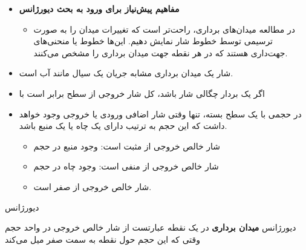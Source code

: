 \begin{ELunit}

\begin{itemize}
\tightlist
\item
  \textbf{مفاهیم پیش‌نیاز برای ورود به بحث دیورژانس}

  \begin{itemize}
  \tightlist
  \item
    در مطالعه میدان‌های برداری، راحت‌تر است که تغییرات میدان را به صورت ترسیمی توسط خطوط شار نمایش دهیم. این‌ها خطوط یا منحنی‌های جهت‌داری هستند که در هر نقطه جهت میدان برداری را مشخص می‌کنند.
  \end{itemize}
\end{itemize}


\begin{itemize}
\tightlist
\item
  شار یک میدان برداری مشابه جریان یک سیال مانند آب است.
\item
  اگر  یک بردار چگالی شار باشد، کل شار خروجی از سطح  برابر است با
\end{itemize}


\begin{itemize}
\tightlist
\item
  در حجمی با یک سطح بسته، تنها وقتی شار اضافی ورودی یا خروجی وجود خواهد داشت که این حجم به ترتیب دارای یک چاه یا یک منبع باشد.

  \begin{itemize}
  \tightlist
  \item
    شار خالص خروجی از  مثبت است: وجود منبع در حجم 
  \item
    شار خالص خروجی از  منفی است: وجود چاه در حجم 
  \item
    شار خالص خروجی از  صفر است.
  \end{itemize}
\end{itemize}


\end{ELunit}

\begin{ELdefinition}{دیورژانس}

دیورژانس \textbf{میدان برداری}  در یک نقطه عبارتست از شار خالص خروجی  در واحد حجم وقتی که این حجم حول نقطه به سمت صفر میل می‌کند


\end{ELdefinition}

